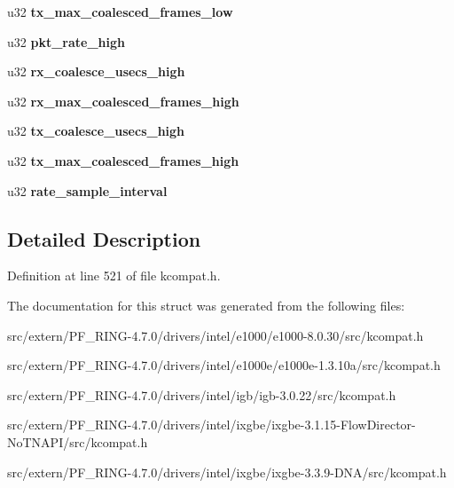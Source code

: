 \begin{DoxyCompactItemize}
\item 
\hypertarget{struct__kc__ethtool__coalesce_a620b48c5cd8ce10d115caecd08823fa9}{
u32 {\bfseries tx\_\-max\_\-coalesced\_\-frames\_\-low}}
\label{struct__kc__ethtool__coalesce_a620b48c5cd8ce10d115caecd08823fa9}

\item 
\hypertarget{struct__kc__ethtool__coalesce_abb42b6860407a5e7ee858a3d654c8bad}{
u32 {\bfseries pkt\_\-rate\_\-high}}
\label{struct__kc__ethtool__coalesce_abb42b6860407a5e7ee858a3d654c8bad}

\item 
\hypertarget{struct__kc__ethtool__coalesce_a7931b3317f686d6b54a0fe5fb00de889}{
u32 {\bfseries rx\_\-coalesce\_\-usecs\_\-high}}
\label{struct__kc__ethtool__coalesce_a7931b3317f686d6b54a0fe5fb00de889}

\item 
\hypertarget{struct__kc__ethtool__coalesce_a9d153494aab69be75e5a2f19a88ced2d}{
u32 {\bfseries rx\_\-max\_\-coalesced\_\-frames\_\-high}}
\label{struct__kc__ethtool__coalesce_a9d153494aab69be75e5a2f19a88ced2d}

\item 
\hypertarget{struct__kc__ethtool__coalesce_a1478be1d37df3c63c0cf8690b6faebe8}{
u32 {\bfseries tx\_\-coalesce\_\-usecs\_\-high}}
\label{struct__kc__ethtool__coalesce_a1478be1d37df3c63c0cf8690b6faebe8}

\item 
\hypertarget{struct__kc__ethtool__coalesce_a12a19dc948d53ed38d890a340ca09a29}{
u32 {\bfseries tx\_\-max\_\-coalesced\_\-frames\_\-high}}
\label{struct__kc__ethtool__coalesce_a12a19dc948d53ed38d890a340ca09a29}

\item 
\hypertarget{struct__kc__ethtool__coalesce_ab66c542531ac63a133045970caed0a4d}{
u32 {\bfseries rate\_\-sample\_\-interval}}
\label{struct__kc__ethtool__coalesce_ab66c542531ac63a133045970caed0a4d}

\end{DoxyCompactItemize}


\subsection{Detailed Description}


Definition at line 521 of file kcompat.h.



The documentation for this struct was generated from the following files:\begin{DoxyCompactItemize}
\item 
src/extern/PF\_\-RING-\/4.7.0/drivers/intel/e1000/e1000-\/8.0.30/src/kcompat.h\item 
src/extern/PF\_\-RING-\/4.7.0/drivers/intel/e1000e/e1000e-\/1.3.10a/src/kcompat.h\item 
src/extern/PF\_\-RING-\/4.7.0/drivers/intel/igb/igb-\/3.0.22/src/kcompat.h\item 
src/extern/PF\_\-RING-\/4.7.0/drivers/intel/ixgbe/ixgbe-\/3.1.15-\/FlowDirector-\/NoTNAPI/src/kcompat.h\item 
src/extern/PF\_\-RING-\/4.7.0/drivers/intel/ixgbe/ixgbe-\/3.3.9-\/DNA/src/kcompat.h\end{DoxyCompactItemize}
